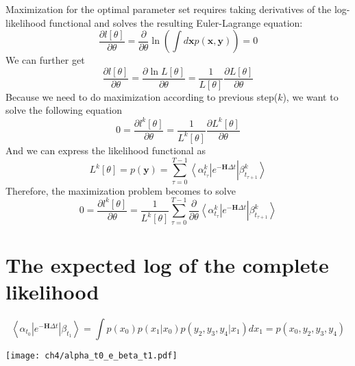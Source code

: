 \begin{definition}
Maximization for the optimal parameter set requires taking derivatives of the log-likelihood functional and solves the resulting Euler-Lagrange equation:
\begin{equation}
        \frac{\partial l[\theta]}{\partial \theta} = \frac{\partial}{\partial \theta} \ln{(\int d\textbf{x}p(\textbf{x}, \textbf{y}))} = 0
\end{equation}
We can further get
\begin{equation}
    \frac{\partial l[\theta]}{\partial \theta} =  \frac{\partial \ln{L[\theta]}}{\partial \theta} = \frac{1}{L[\theta]}\frac{\partial L[\theta]}{\partial \theta}
\end{equation}
Because we need to do maximization according to previous step($k$), we want to solve the
following equation
\begin{equation}
    0 = \frac{\partial l^k[\theta]}{\partial \theta} = \frac{1}{L^k[\theta]}\frac{\partial L^k[\theta]}{\partial \theta}
\end{equation}
And we can express the likelihood functional as
\begin{equation}
    L^k[\theta] = p(\textbf{y}) = \sum_{\tau=0}^{T-1} \left<\alpha^k_{t_{\tau}}\right|  e^{-\textbf{H} \Delta t} \left|\beta^k_{t_{\tau+1}}\right>
\end{equation}
Therefore, the maximization problem becomes to solve
\begin{equation}
    0 =  \frac{\partial l^k[\theta]}{\partial \theta} = \frac{1}{L^k[\theta]} \sum_{\tau=0}^{T-1} \frac{\partial}{\partial \theta} \left<\alpha^k_{t_{\tau}}\right|  e^{-\textbf{H} \Delta t} \left|\beta^k_{t_{\tau+1}}\right>
\end{equation}
\end{definition}

\section{The expected log of the complete likelihood}
\begin{definition}
\begin{equation}
    \left< \alpha_{t_0} | e^{-\textbf{H}\Delta t} | \beta_{t_1} \right> = \int p(x_0) p(x_1|x_0) p(y_2,y_3,y_4|x_1) dx_1= p(x_0,y_2,y_3,y_4)
\end{equation}
    \begin{center}
        \texttt{[image: ch4/alpha\_t0\_e\_beta\_t1.pdf]}   
    \end{center}
\end{definition}

